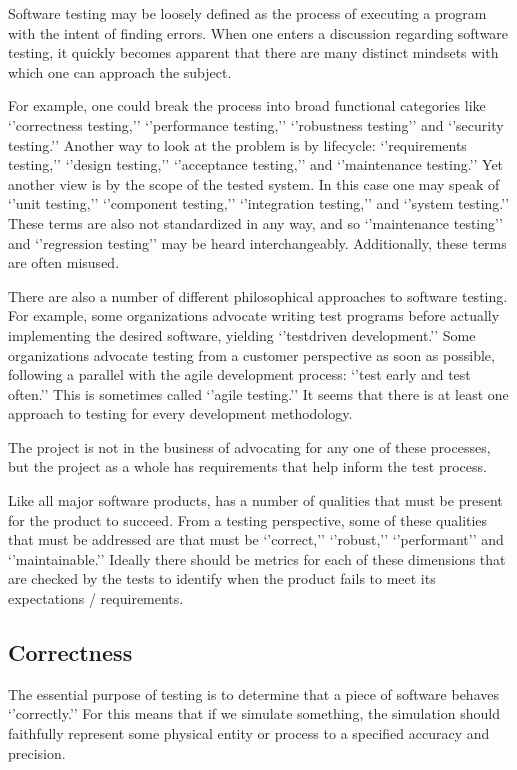 \documentclass[letterpaper,10pt,english]{sphinxmanual}
\begin{document}
Software testing may be loosely defined as the process of executing a program
with the intent of finding errors.  When one enters a discussion regarding
software testing, it quickly becomes apparent that there are many distinct
mind\sphinxhyphen{}sets with which one can approach the subject.

For example, one could break the process into broad functional categories
like ‘’correctness testing,’’ ‘’performance testing,’’ ‘’robustness testing’’
and ‘’security testing.’’  Another way to look at the problem is by life\sphinxhyphen{}cycle:
‘’requirements testing,’’ ‘’design testing,’’ ‘’acceptance testing,’’ and
‘’maintenance testing.’’  Yet another view is by the scope of the tested system.
In this case one may speak of ‘’unit testing,’’ ‘’component testing,’’
‘’integration testing,’’ and ‘’system testing.’’  These terms are also not
standardized in any way, and so ‘’maintenance testing’’ and ‘’regression
testing’’ may be heard interchangeably.  Additionally, these terms are often
misused.

There are also a number of different philosophical approaches to software
testing.  For example, some organizations advocate writing test programs
before actually implementing the desired software, yielding ‘’test\sphinxhyphen{}driven
development.’’  Some organizations advocate testing from a customer perspective
as soon as possible, following a parallel with the agile development process:
‘’test early and test often.’’  This is sometimes called ‘’agile testing.’’  It
seems that there is at least one approach to testing for every development
methodology.

The  project is not in the business of advocating for any one of
these processes, but the project as a whole has requirements that help inform
the test process.

Like all major software products,  has a number of qualities that
must be present for the product to succeed.  From a testing perspective, some
of these qualities that must be addressed are that  must be
‘’correct,’’ ‘’robust,’’  ‘’performant’’ and ‘’maintainable.’’  Ideally there
should be metrics for each of these dimensions that are checked by the tests
to identify when the product fails to meet its expectations / requirements.


\subsection{Correctness}
\label{\detokenize{test-background:correctness}}
The essential purpose of testing is to determine that a piece of software
behaves ‘’correctly.’’  For  this means that if we simulate
something, the simulation should faithfully represent some physical entity or
process to a specified accuracy and precision.
\end{document}
